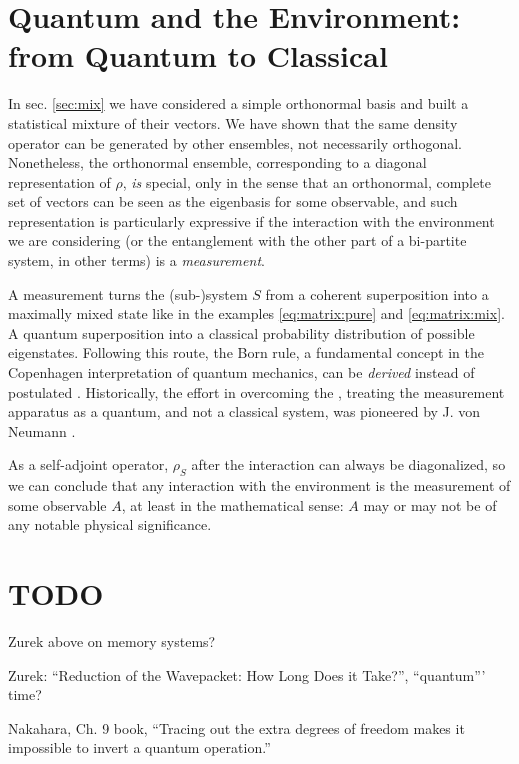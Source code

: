 \section{Quantum and the Environment: from Quantum to Classical}
\label{sec:q2c}

In sec. \ref{sec:mix} we have considered a simple orthonormal basis
and built a statistical mixture of their vectors. We have shown
that the same density operator can be generated by other ensembles,
not necessarily orthogonal. Nonetheless, the orthonormal ensemble,
corresponding to a diagonal representation of $\rho$, \emph{is}
special, only in the sense that an orthonormal, complete set of
vectors can be seen as the eigenbasis for some observable,
and such representation is particularly expressive if the
interaction with the environment we are considering
(or the entanglement with the other part of a bi-partite system, in other terms)
is a \emph{measurement}.

A measurement turns
the (sub-)system $S$ from a coherent superposition into a
maximally mixed state like in the examples
\eqref{eq:matrix:pure} and \eqref{eq:matrix:mix}.
A quantum superposition into a classical probability
distribution of possible eigenstates.
Following this route, the Born rule, a fundamental concept in the
Copenhagen interpretation of quantum mechanics, can be
\emph{derived} instead of postulated
\parencite{Zurek_Einselect}.
Historically,
the effort in overcoming the ,
treating the measurement apparatus as a quantum,
and not a classical system,
was pioneered by J. von Neumann \parencite{VonNeumann}.

As a self-adjoint operator, $\rho_S$ after the interaction
can always be diagonalized, so we can conclude that any
interaction with the environment is the measurement of some
observable $A$, at least in the mathematical sense: $A$ may or
may not be of any notable physical significance.

\section{TODO}

Zurek above \parencite{Zurek_Einselect} on memory systems? 

Zurek: ``Reduction of the Wavepacket: How Long Does it Take?'',
``quantum''' time?

Nakahara, Ch. 9 book, ``Tracing out the extra degrees of freedom makes it impossible to invert a quantum operation.''

